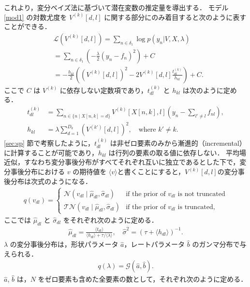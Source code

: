 \documentclass[paper=a4,10.5pt]{jsarticle} %
\numberwithin{equation}{section} %
\begin{document}
これより，変分ベイズ法に基づいて潜在変数の推定量を導出する．
モデル \eqref{mod1} の対数尤度を $V^{(k)}[d,l]$ に関する部分にのみ着目すると次のように表すことができる．
\begin{align*}
& \mathcal{L}(V^{(k)}[d,l]) =\sum_{n \in \delta_1} \log p(y_n|V, X, \lambda)\\
&= \sum_{n \in \delta_1}\left(-\frac{\lambda}{2}( y_n -f_n)^2\right)+ C\\
&= -\frac{h_{kl}}{2}\left((V^{(k)}[d,l])^2-2V^{(k)}[d,l]\frac{t_{dl}^{(k)}}{h_{kl}}\right) + C.
\end{align*}
ここで $C$ は $V^{(k)}$ に依存しない定数項であり，$t_{dl}^{(k)}$ と $h_{kl}$ は次のように定める．
\begin{align}
t_{dl}^{(k)} &= \sum_{n \in \{n \mid  X[n,k] = d\}} V^{(k)}[X[n,k], l] \left( y_{n} - \sum_{l'\neq l} f_{nl} \right), \label{eq_eta}\\
h_{kl} &= \lambda \sum_{d=1}^{D_k} (V^{(k')} [d,l])^2, \quad \mbox{where $k' \neq k$}. \label{eq_h}
\end{align}
\ref{sec:sp} 節で考察したように，$t_{dl}^{(k)}$ は非ゼロ要素のみから漸進的（incremental）に計算することが可能であり，$h_{kl}$ は行列の要素の取る値に依存しない．
平均場近似，すなわち変分事後分布がすべてそれぞれ互いに独立であるとした下で，変分事後分布における $v$ の期待値を $\langle v \rangle$と書くことにすると，$V^{(k)}[d,l]$の変分事後分布は次式のようになる．
\begin{align}
q(v_{dl})= \begin{cases}
\mathcal{N}(v_{dl} \mid \hat{\mu}_{dl}, \hat{\sigma}_{dl}) & \mbox{if the prior of $v_{dl}$ is not truncated} \\
\mathcal{TN}(v_{dl} \mid \hat{\mu}_{dl}, \hat{\sigma}_{dl}) & \mbox{if the prior of $v_{dl}$ is truncated},     
\end{cases} \label{qv}
\end{align}
ここでは $\hat{\mu}_{dl}$ と $\hat{\sigma}_{dl}$ をそれぞれ次のように定める．
\begin{align}
\hat{\mu}_{dl} =\frac{\langle t_{dl} \rangle}{\langle h_{dl}\rangle+\tau/\langle\lambda\rangle}, \quad \hat{\sigma}^2 =\left(\tau + \langle h_{dl} \rangle \right)^{-1}. \label{eq_musigma}
\end{align}
$\lambda$ の変分事後分布は，形状パラメータ $\hat a$，レートパラメータ $\hat b$ のガンマ分布で与えられる．
\begin{align}
 q(\lambda) = \mathcal{G}(\hat a, \hat b ). \label{qlam}
\end{align}
$\hat a$, $\hat b$ は，$N$ をゼロ要素も含めた全要素の数として，それぞれ次のように定める．
\end{document}
